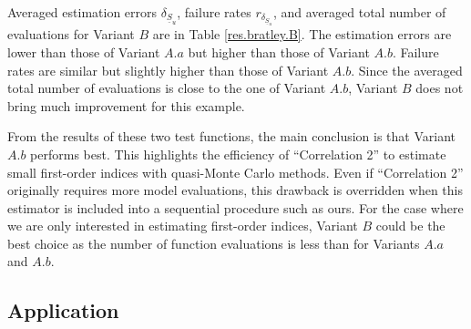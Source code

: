 Averaged estimation errors $\delta_{\underline{S}_u}$, failure rates $r_{\delta_{\underline{S}_u}}$, and averaged total number of evaluations for Variant $B$ are  in Table \ref{res.bratley.B}. The estimation errors are lower than those of Variant $A.a$ but higher than those of Variant $A.b$. Failure rates are similar but slightly higher than those of Variant $A.b$. Since the averaged total number of evaluations is close to the one of Variant $A.b$,  Variant $B$ does not bring much improvement for this example.
\bigskip

From the results of these two test functions, the main conclusion is that Variant $A.b$ performs best. This highlights the efficiency of ``Correlation 2'' to estimate small first-order indices with quasi-Monte Carlo methods. Even if ``Correlation 2'' originally requires more model evaluations, this drawback is overridden when this estimator is included into a sequential procedure such as ours. For the case where we are only interested in estimating first-order indices, Variant $B$ could be the best choice as the number of function evaluations is less than for Variants $A.a$ and $A.b$.

\subsection{Application}
\label{sec:5.2}

